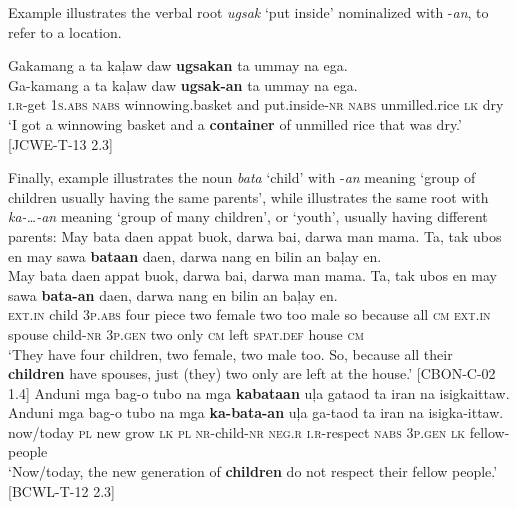 Example  illustrates the verbal root \textit{ugsak} ‘put inside’ nominalized with -\textit{an}, to refer to a location.

\ea
\label{bkm:Ref106949527}
Gakamang  a  ta  kaļaw  daw  \textbf{ugsakan}  ta ummay  na  ega. \\\smallskip
 \gll Ga-kamang  a  ta  kaļaw  daw  \textbf{ugsak-an}  ta ummay  na  ega. \\
\textsc{i.r}-get  1\textsc{s.abs}  \textsc{nabs}  winnowing.basket  and  put.inside-\textsc{nr}  \textsc{nabs} unmilled.rice \textsc{lk} dry \\
\glt `I got a winnowing basket and a \textbf{container} of unmilled rice that was dry.’ [JCWE-T-13 2.3]
\z

Finally, example  illustrates the noun \textit{bata} ‘child’ with -\textit{an} meaning ‘group of children usually having the same parents’, while  illustrates the same root with \textit{ka-…-an} meaning ‘group of many children’, or ‘youth’, usually having different parents:
\ea
\label{bkm:Ref106950024}
May  bata  daen  appat  buok,  darwa  bai,  darwa  man  mama.  Ta,  tak ubos  en  may  sawa  \textbf{bataan}  daen,  darwa  nang  en  bilin  an  baļay  en. \\\smallskip
 \gll May  bata  daen  appat  buok,  darwa  bai,  darwa  man  mama.  Ta,  tak ubos  en  may  sawa  \textbf{bata-an}  daen,  darwa  nang  en  bilin  an  baļay  en. \\
\textsc{ext.in}  child  3\textsc{p.abs}  four  piece  two  female  two   too  male  so  because all  \textsc{cm}  \textsc{ext.in}  spouse  child-\textsc{nr}  3\textsc{p.gen}  two  only  \textsc{cm}  left  \textsc{spat.def}  house  \textsc{cm} \\
\glt `They have four children, two female, two male too. So, because all their \textbf{children} have spouses, just (they) two only are left at the house.’ [CBON-C-02 1.4]
\z
\ea
\label{bkm:Ref106950027}
Anduni  mga  bag-o  tubo  na  mga  \textbf{kabataan}  uļa  gataod  ta iran  na  isigkaittaw. \\\smallskip
 \gll Anduni  mga  bag-o  tubo  na  mga  \textbf{ka-bata-an}  uļa  ga-taod  ta iran  na  isigka-ittaw.\footnotemark{} \\
now/today  \textsc{pl}  new  grow  \textsc{lk}  \textsc{pl} \textsc{nr}-child-\textsc{nr} \textsc{neg.r}  \textsc{i.r}-respect  \textsc{nabs} 3\textsc{p.gen}  \textsc{lk}  fellow-people \\
\glt `Now/today, the new generation of \textbf{children} do not respect their fellow people.’ [BCWL-T-12 2.3]
\z

